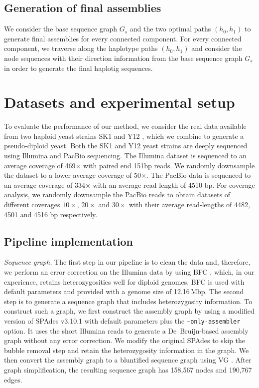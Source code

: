\subsection{Generation of final assemblies}
We consider the base sequence graph $G_s$ and the two optimal paths $(h_0,h_1)$ to generate final assemblies for every connected component.
For every connected component, we traverse along the haplotype paths $(h_0,h_1)$ and consider the node sequences with their direction information from the base sequence graph $G_s$ in order to generate the final haplotig sequences.

\section{Datasets and experimental setup}
To evaluate the performance of our method, we consider the real data available from two haploid yeast strains SK1 and Y12 \citep{yue2017contrasting}, which we combine to generate a pseudo-diploid yeast.
Both the SK1 and Y12 yeast strains are deeply sequenced using Illumina and PacBio sequencing.
The Illumina dataset is sequenced to an average coverage of 469$\times$ with paired end 151bp reads. We randomly downsample the dataset to a lower average coverage of 50$\times$.
The PacBio data is sequenced to an average coverage of 334$\times$ with an average read length of 4510 bp. 
For coverage analysis, we randomly downsample the PacBio reads to obtain datasets of different coverages $10\times$, $20\times$ and $30\times$ with their average read-lengths of 4482, 4501 and 4516 bp respectively.

\subsection{Pipeline implementation}
\textit{Sequence graph.}
The first step in our pipeline is to clean the data and, therefore, we perform an error correction on the Illumina data by using BFC \citep{li2015bfc}, which, in our experience, retains heterozygosities well for diploid genomes.
BFC is used with default parameters and provided with a genome size of 12.16\,Mbp.
The second step is to generate a sequence graph that includes heterozygosity information.
To construct such a graph, we first construct the assembly graph by using a modified version of SPAdes v3.10.1 \citep{bankevich2012spades} with default parameters plus the \texttt{--only-assembler} option.
It uses the short Illumina reads to generate a De~Bruijn-based assembly graph without any error correction.
We modify the original SPAdes to skip the bubble removal step and retain the heterozygosity information in the graph.
We then convert the assembly graph to a bluntified sequence graph using VG \citep{garrison2017sequence}.
After graph simplification, the resulting sequence graph has 158,567 nodes and 190,767 edges.

